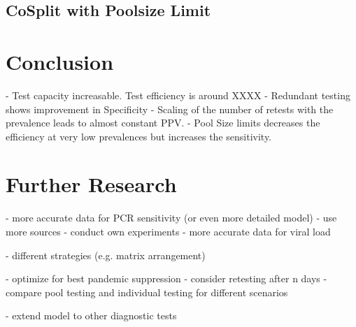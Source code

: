 \documentclass[fleqn,10pt]{wlscirep}
\begin{document}
\subsection{CoSplit with Poolsize Limit}



\section{Conclusion}

- Test capacity increasable. Test efficiency is around XXXX %
- Redundant testing shows improvement in Specificity
- Scaling of the number of retests with the prevalence leads to almost constant PPV.
- Pool Size limits decreases the efficiency at very low prevalences but increases the sensitivity.

\section{Further Research}
- more accurate data for PCR sensitivity (or even more detailed model)
	- use more sources
	- conduct own experiments
- more accurate data for viral load

- different strategies (e.g. matrix arrangement)

- optimize for best pandemic suppression
	- consider retesting after n days
	- compare pool testing and individual testing for different scenarios 
	
- extend model to other diagnostic tests






\end{document}
